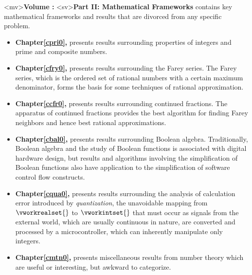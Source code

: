 <mv>\textbf{Volume \vmfrzeroroman{}: \vmfrzerotitle{}} 
<sv>\textbf{Part II:  Mathematical Frameworks}
contains key mathematical frameworks and
results that are divorced from any specific problem.
\begin{itemize}
\item \textbf{Chapter\;\ref{cpri0}, \cprizerotitle{}} presents results surrounding
      properties of integers and prime and composite numbers.
\item \textbf{Chapter\;\ref{cfry0}, \cfryzerotitle{}} presents results surrounding
      the Farey series.  The Farey series, which is the 
      ordered set of rational numbers with a certain maximum denominator,
      forms the basis for some techniques of rational approximation.
\item \textbf{Chapter\;\ref{ccfr0}, \ccfrzerotitle{}} presents results surrounding
      continued fractions.  The apparatus of continued
      fractions provides the best algorithm for finding Farey neighbors and hence
      best rational approximations.
\item \textbf{Chapter\;\ref{cbal0}, \cbalzerotitle{}} presents results surrounding
      Boolean algebra.  Traditionally, Boolean algebra and the study of Boolean
      functions is associated with digital hardware design, but results and
      algorithms involving the simplification of Boolean functions also have
      application to the simplification of software control flow constructs.
\item \textbf{Chapter\;\ref{cqua0}, \cquazerotitle{}} presents results surrounding
      the analysis of calculation error introduced by \emph{quantization}, the
      unavoidable mapping from $\vworkrealset{}$ to $\vworkintset{}$ that must occur
      as signals from the external world, which are usually continuous in nature,
      are converted and processed by a microcontroller, which can inherently manipulate
      only integers.
\item \textbf{Chapter\;\ref{cmtn0}, \cmtnzerotitle{}} presents miscellaneous results
      from number theory which are useful or interesting, but awkward to
      categorize.
\end{itemize}


